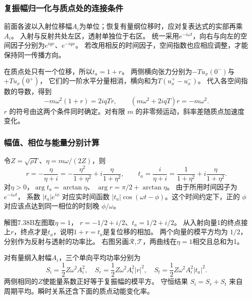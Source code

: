 \documentclass[UTF8,fontset=fandol,a4paper,11pt]{ctexart}
\begin{document}
\subsubsection*{复振幅归一化与质点处的连接条件}
前面各波以入射位移幅$A_i$为单位；恢复有量纲位移时，应对复表达式的实部再乘$A_i$。
入射与反射共处左区，透射单独位于右区。
统一采用$e^{-i\omega t}$，向右与向左的空间因子分别为$e^{iqx}$、$e^{-iqx}$。
若改用相反的时间因子，空间指数也应相应调整，才能保持同一传播方向。

在质点处只有一个位移，所以$t_a=1+r$。
两侧横向张力分别为$-Tu_x(0^-)$与$+Tu_x(0^+)$，
它们的一阶水平分量相消，横向和为$T(u_x^+-u_x^-)$。
代入各空间指数的导数，得到
\[
-m\omega^2(1+r)=2iqTr,\qquad
(m\omega^2+2iqT)r=-m\omega^2.
\]
$r$ 的符号由这两个条件同时确定。对有限 $m$ 的非零频运动，斜率差随质点加速度变化。

\subsubsection*{幅值、相位与能量分别计算}
令$Z=\sqrt{\rho T}$、$\eta=m\omega/(2Z)$，则
\[
r=-\frac\eta{\eta+i}
=-\frac{\eta^2}{1+\eta^2}+i\frac\eta{1+\eta^2},\qquad
t_a=\frac i{\eta+i}
=\frac1{1+\eta^2}+i\frac\eta{1+\eta^2}.
\]
对$\eta>0$，$\arg t_a=\arctan\eta$、
$\arg r=\pi/2+\arctan\eta$。
由于所用时间因子为$e^{-i\omega t}$，
系数 $|t_a|e^{i\phi}$ 对应实时间函数 $|t_a|\cos(\omega t-\phi)$。这个时间约定下，正的 $\phi$ 对应该点达到同一相位的时刻晚 $\phi/\omega$。

解图7.38B左图取$\eta=1$，
$r=-1/2+i/2$、$t_a=1/2+i/2$。
从入射向量1的终点接上$r$，终点才是$t_a$，说明$1+r=t_a$是复位移的相加。
两个向量的模平方均为 $1/2$，分别作为反射与透射的功率比。
右图另画$\mathcal R,\mathcal T$，两曲线在$\eta=1$相交且总和为1。

对有量纲入射幅$A_i$，三个单向平均功率分别为
\[
S_i=\frac12Z\omega^2A_i^2,\quad
S_r=\frac12Z\omega^2A_i^2|r|^2,\quad
S_t=\frac12Z\omega^2A_i^2|t_a|^2.
\]
两侧相同的$Z$使能量系数正好等于复振幅的模平方。
守恒结果 $S_i=S_r+S_t$ 来自周期平均。瞬时关系还含下面的质点动能变化率。
\end{document}
